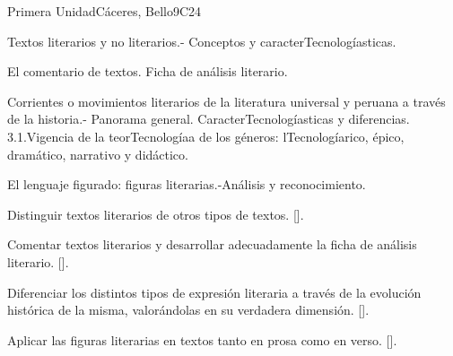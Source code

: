 \begin{syllabus}
\begin{outcomes}
    \item {}
    \item {}
\end{outcomes}
\begin{competences}
    \item {}
\end{competences}

\begin{unit}{}{Primera Unidad}{Cáceres, Bello}{9}{C24}
\begin{topics}
	\item Textos literarios y no literarios.- Conceptos y caracterTecnologíasticas.
	\item El comentario de textos. Ficha de análisis literario.
	\item Corrientes o movimientos literarios de la literatura universal y peruana a través de la historia.- Panorama general. CaracterTecnologíasticas y diferencias.
	3.1.Vigencia de la teorTecnologíaa de los géneros: lTecnologíarico, épico, dramático, narrativo y didáctico.
	\item El lenguaje figurado: figuras literarias.-Análisis y reconocimiento.
\end{topics}
\begin{learningoutcomes}
	\item Distinguir textos literarios de otros tipos de textos. [\Usage].
	\item Comentar textos literarios y desarrollar adecuadamente la ficha de análisis literario. [\Usage].
	\item Diferenciar los distintos tipos de expresión literaria a través de la evolución histórica de la misma, valorándolas en su verdadera dimensión. [\Usage].
	\item Aplicar las figuras literarias en textos tanto en prosa como en verso. [\Usage].
\end{learningoutcomes}
\end{unit}


\end{syllabus}
